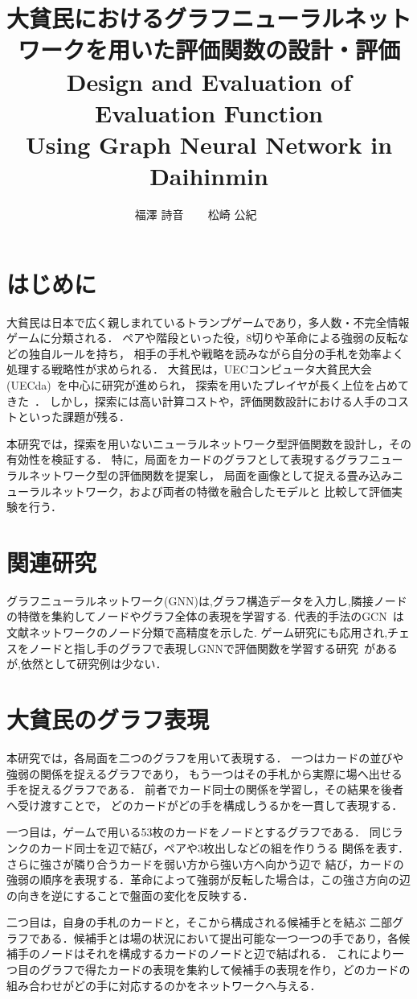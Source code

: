 \documentclass[a4j,dvipdfmx]{jarticle}
\title{大貧民におけるグラフニューラルネットワークを用いた評価関数の設計・評価 \\
\vspace{0.3em}
\large Design and Evaluation of Evaluation Function \\ Using Graph Neural Network in Daihinmin}
\author{福澤 詩音   ~~~ 松崎 公紀 ~~~~}
\begin{document}
\begin{Abstract}
 
 \section{はじめに}
大貧民は日本で広く親しまれているトランプゲームであり，多人数・不完全情報ゲームに分類される．
ペアや階段といった役，8切りや革命による強弱の反転などの独自ルールを持ち，
相手の手札や戦略を読みながら自分の手札を効率よく処理する戦略性が求められる．
大貧民は，UECコンピュータ大貧民大会(UECda)~\cite{bib:uecdda}を中心に研究が進められ，
探索を用いたプレイヤが長く上位を占めてきた~\cite{bib:ohto2016}．
しかし，探索には高い計算コストや，評価関数設計における人手のコストといった課題が残る．

本研究では，探索を用いないニューラルネットワーク型評価関数を設計し，その有効性を検証する．
特に，局面をカードのグラフとして表現するグラフニューラルネットワーク型の評価関数を提案し，
局面を画像として捉える畳み込みニューラルネットワーク，および両者の特徴を融合したモデルと
比較して評価実験を行う．

\section{関連研究}
グラフニューラルネットワーク(GNN)は,グラフ構造データを入力し,隣接ノードの特徴を集約してノードやグラフ全体の表現を学習する.
代表的手法のGCN~\cite{bib:gcn}は文献ネットワークのノード分類で高精度を示した.
ゲーム研究にも応用され,チェスをノードと指し手のグラフで表現しGNNで評価関数を学習する研究~\cite{bib:alphagateau, bib}があるが,依然として研究例は少ない．


\section{大貧民のグラフ表現}
本研究では，各局面を二つのグラフを用いて表現する．
一つはカードの並びや強弱の関係を捉えるグラフであり，
もう一つはその手札から実際に場へ出せる手を捉えるグラフである．
前者でカード同士の関係を学習し，その結果を後者へ受け渡すことで，
どのカードがどの手を構成しうるかを一貫して表現する．

一つ目は，ゲームで用いる53枚のカードをノードとするグラフである．
同じランクのカード同士を辺で結び，ペアや3枚出しなどの組を作りうる
関係を表す．さらに強さが隣り合うカードを弱い方から強い方へ向かう辺で
結び，カードの強弱の順序を表現する．革命によって強弱が反転した場合は，この強さ方向の辺の向きを逆にすることで盤面の変化を反映する．

二つ目は，自身の手札のカードと，そこから構成される候補手とを結ぶ
二部グラフである．候補手とは場の状況において提出可能な一つ一つの手であり，各候補手のノードはそれを構成するカードのノードと辺で結ばれる．
これにより一つ目のグラフで得たカードの表現を集約して候補手の表現を作り，どのカードの組み合わせがどの手に対応するのかをネットワークへ与える．



\end{Abstract}
\end{document}
